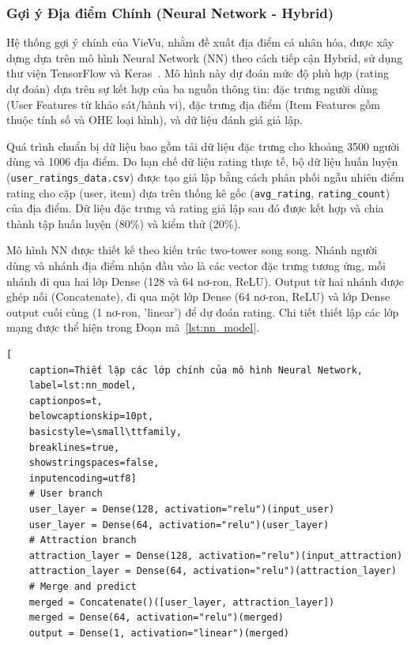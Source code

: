 \subsubsection{Gợi ý Địa điểm Chính (Neural Network - Hybrid)}
\label{subsubsec:nn_recsys_impl_paragraph_final} %

Hệ thống gợi ý chính của VieVu, nhằm đề xuất địa điểm cá nhân hóa, được xây dựng dựa trên mô hình Neural Network (NN) theo cách tiếp cận Hybrid, sử dụng thư viện TensorFlow và Keras~\cite{tensorflow_lib, keras_lib}. Mô hình này dự đoán mức độ phù hợp (rating dự đoán) dựa trên sự kết hợp của ba nguồn thông tin: đặc trưng người dùng (User Features từ khảo sát/hành vi), đặc trưng địa điểm (Item Features gồm thuộc tính số và OHE loại hình), và dữ liệu đánh giá giả lập.

Quá trình chuẩn bị dữ liệu bao gồm tải dữ liệu đặc trưng cho khoảng 3500 người dùng và 1006 địa điểm. Do hạn chế dữ liệu rating thực tế, bộ dữ liệu huấn luyện (\texttt{user\_ratings\_data.csv}) được tạo giả lập bằng cách phân phối ngẫu nhiên điểm rating cho cặp (user, item) dựa trên thống kê gốc (\texttt{avg\_rating}, \texttt{rating\_count}) của địa điểm. Dữ liệu đặc trưng và rating giả lập sau đó được kết hợp và chia thành tập huấn luyện (80\%) và kiểm thử (20\%).

Mô hình NN được thiết kế theo kiến trúc two-tower song song. Nhánh người dùng và nhánh địa điểm nhận đầu vào là các vector đặc trưng tương ứng, mỗi nhánh đi qua hai lớp Dense (128 và 64 nơ-ron, ReLU). Output từ hai nhánh được ghép nối (Concatenate), đi qua một lớp Dense (64 nơ-ron, ReLU) và lớp Dense output cuối cùng (1 nơ-ron, 'linear') để dự đoán rating. Chi tiết thiết lập các lớp mạng được thể hiện trong Đoạn mã~\ref{lst:nn_model}. %

\lstset{language=python}
\begin{lstlisting}[
    caption=Thiết lập các lớp chính của mô hình Neural Network,
    label=lst:nn_model,
    captionpos=t,
    belowcaptionskip=10pt,
    basicstyle=\small\ttfamily,
    breaklines=true,
    showstringspaces=false,
    inputencoding=utf8]
    # User branch
    user_layer = Dense(128, activation="relu")(input_user)
    user_layer = Dense(64, activation="relu")(user_layer)
    # Attraction branch
    attraction_layer = Dense(128, activation="relu")(input_attraction)
    attraction_layer = Dense(64, activation="relu")(attraction_layer)
    # Merge and predict
    merged = Concatenate()([user_layer, attraction_layer])
    merged = Dense(64, activation="relu")(merged)
    output = Dense(1, activation="linear")(merged)
    
\end{lstlisting}

